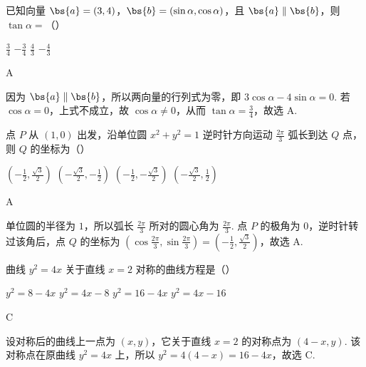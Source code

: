 \begin{problem}
已知向量 \(\bs{a} = (3, 4)\)，\(\bs{b} = (\sin \alpha, \cos \alpha)\)，且 \(\bs{a} \parallel \bs{b}\)，则 \(\tan \alpha =\)（\quad）

\choices
    {\(\frac{3}{4}\)}
    {\(-\frac{3}{4}\)}
    {\(\frac{4}{3}\)}
    {\(-\frac{4}{3}\)}
\end{problem}

\begin{answer}
A
\end{answer}

\begin{solution}
因为 \(\bs{a}\parallel\bs{b}\)，所以两向量的行列式为零，即
\(3\cos\alpha-4\sin\alpha=0\). 若 \(\cos\alpha=0\)，上式不成立，故 \(\cos\alpha\neq0\)，从而 \(\tan\alpha=\frac{3}{4}\)，故选 A.
\end{solution}

\begin{problem}
点 \(P\) 从 \(\left(1, 0\right)\) 出发，沿单位圆 \(x^{2} + y^{2} = 1\) 逆时针方向运动 \(\frac{2\pi}{3}\) 弧长到达 \(Q\) 点，则 \(Q\) 的坐标为（\quad）

\choices
    {\(\left(-\frac{1}{2}, \frac{\sqrt{3}}{2}\right)\)}
    {\(\left(-\frac{\sqrt{3}}{2}, -\frac{1}{2}\right)\)}
    {\(\left(-\frac{1}{2}, -\frac{\sqrt{3}}{2}\right)\)}
    {\(\left(-\frac{\sqrt{3}}{2}, \frac{1}{2}\right)\)}
\end{problem}

\begin{answer}
A
\end{answer}

\begin{solution}
单位圆的半径为 \(1\)，所以弧长 \(\frac{2\pi}{3}\) 所对的圆心角为 \(\frac{2\pi}{3}\). 点 \(P\) 的极角为 \(0\)，逆时针转过该角后，点 \(Q\) 的坐标为
\(\left(\cos\frac{2\pi}{3},\sin\frac{2\pi}{3}\right)=\left(-\frac{1}{2},\frac{\sqrt{3}}{2}\right)\)，故选 A.
\end{solution}

\begin{problem}
曲线 \(y^{2} = 4x\) 关于直线 \(x = 2\) 对称的曲线方程是（\quad）

\choices
    {\(y^{2} = 8 - 4x\)}
    {\(y^{2} = 4x - 8\)}
    {\(y^{2} = 16 - 4x\)}
    {\(y^{2} = 4x - 16\)}
\end{problem}

\begin{answer}
C
\end{answer}

\begin{solution}
设对称后的曲线上一点为 \((x,y)\)，它关于直线 \(x=2\) 的对称点为 \((4-x,y)\). 该对称点在原曲线 \(y^2=4x\) 上，所以
\(y^2=4(4-x)=16-4x\)，故选 C.
\end{solution}

